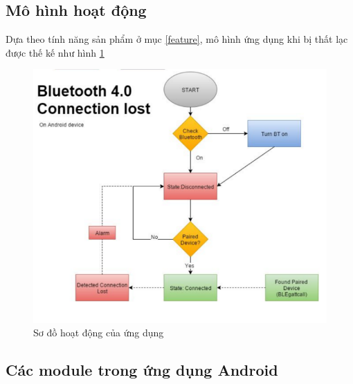 \subsection{Mô hình hoạt động}
Dựa theo tính năng sản phẩm ở mục \ref{feature}, mô hình ứng dụng khi bị thất lạc được thế kế như hình \ref{fig: blelost}
	\begin{figure}[h]
		\centering    
		\includegraphics[width=1.0\textwidth]{blelost}
		\caption[Sơ đồ hoạt động trên thiết bị di động]{Sơ đồ hoạt động của ứng dụng}
		\label{fig: blelost}
	\end{figure}
\subsection{Các module trong ứng dụng Android}

